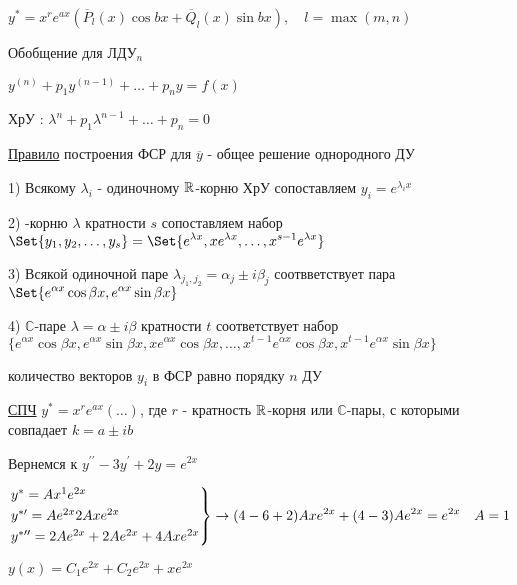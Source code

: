 \documentclass[12pt]{article}
\begin{document}
    $\displaystyle y^* = x^r e^{ax} (\overline{P}_l (x)\cos bx + \overline{Q}_l (x) \sin bx), \quad l = \max(m, n)$

    \vspace{5mm}
    Обобщение для ЛДУ$\displaystyle _n$

    $\displaystyle y^{(n)} + p_1 y^{(n - 1)} + \dots + p_n y = f(x)$

    ХрУ \Cat: $\displaystyle \lambda^n + p_1 \lambda^{n - 1} + \dots + p_n = 0$

    \vspace{5mm}
    \underline{Правило} построения ФСР для $\overline{y}$ - общее решение однородного ДУ

    1) Всякому $\displaystyle \lambda_i$ - одиночному $\mathbb{R}$-корню ХрУ сопоставляем $\displaystyle y_i = e^{\lambda_i x}$

    2) \Real-корню $\lambda$ кратности $s$ сопоставляем набор $\displaystyle \Set{y_1, y_2, \dots, y_s} = \Set{e^{\lambda x}, xe^{\lambda x}, \dots, x^{s - 1} e^{\lambda x}}$

    3) Всякой одиночной паре $\displaystyle \lambda_{j_1,j_2} = \alpha_j \pm i\beta_j$ соотвветствует пара $\displaystyle \Set{e^{\alpha x} \cos\beta x, e^{\alpha x} \sin\beta x}$

    4) $\mathbb{C}$-паре $\lambda = \alpha \pm i\beta$ кратности $t$ соответствует набор $\displaystyle \{e^{\alpha x} \cos \beta x, e^{\alpha x} \sin \beta x, x e^{\alpha x} \cos \beta x, \dots, x^{t - 1}e^{\alpha x} \cos\beta x, x^{t - 1}e^{\alpha x} \sin\beta x\}$

    \Nota количество векторов $\displaystyle y_i$ в ФСР равно порядку $n$ ДУ

    \underline{СПЧ} $\displaystyle y^* = x^r e^{ax} (\dots)$, где $r$ - кратность $\mathbb{R}$-корня или $\mathbb{C}$-пары, с которыми совпадает $k = a \pm ib$

    \Ex Вернемся к $\displaystyle y^{\prime\prime} - 3y^\prime + 2y = e^{2x}$

    $\displaystyle \begin{rcases*}
    y^* = Ax^1 e^{2x} \\

    y^{*\prime} = Ae^{2x} 2Axe^{2x} \\

    y^{*\prime\prime} = 2Ae^{2x} + 2Ae^{2x} + 4Axe^{2x}
    \end{rcases*} \to (4 - 6 + 2) Axe^{2x} + (4 - 3) Ae^{2x} = e^{2x} \quad A = 1$

    $\displaystyle y(x) = C_1 e^{2x} + C_2 e^{2x} + xe^{2x}$
\end{document}
